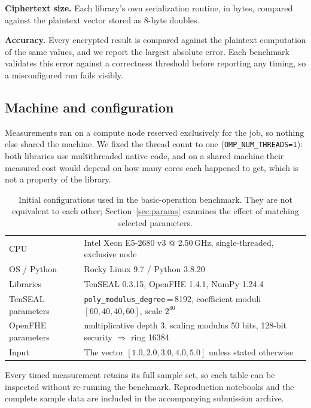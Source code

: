 \documentclass[11pt,a4paper]{article}
\begin{document}
\textbf{Ciphertext size.} Each library's own serialization routine, in bytes,
compared against the plaintext vector stored as 8-byte doubles.

\textbf{Accuracy.} Every encrypted result is compared against the plaintext
computation of the same values, and we report the largest absolute error. Each
benchmark validates this error against a correctness threshold before reporting any
timing, so a misconfigured run fails visibly.

\subsection{Machine and configuration}

Measurements ran on a compute node reserved exclusively for the job, so nothing else
shared the machine. We fixed the thread count to one
(\texttt{OMP\_NUM\_THREADS=1}): both libraries use multithreaded native code, and on
a shared machine their measured cost would depend on how many cores each happened to
get, which is not a property of the library.

\begin{table}[H]\centering\small
\begin{tabular}{@{}ll@{}}
\toprule
CPU & Intel Xeon E5-2680 v3 @ 2.50\,GHz, single-threaded, exclusive node \\
OS / Python & Rocky Linux 9.7 / Python 3.8.20 \\
Libraries & TenSEAL 0.3.15, OpenFHE 1.4.1, NumPy 1.24.4 \\
TenSEAL parameters & \texttt{poly\_modulus\_degree}\,=\,8192, coefficient moduli
  $[60,40,40,60]$, scale $2^{40}$ \\
OpenFHE parameters & multiplicative depth 3, scaling modulus 50 bits, 128-bit
  security $\Rightarrow$ ring 16384 \\
Input & The vector $[1.0, 2.0, 3.0, 4.0, 5.0]$ unless stated otherwise \\
\bottomrule
\end{tabular}
\caption{Initial configurations used in the basic-operation benchmark. They are not
equivalent to each other; Section~\ref{sec:params} examines the effect of matching
selected parameters.}
\end{table}

Every timed measurement retains its full sample set, so each table can be inspected
without re-running the benchmark. Reproduction notebooks and the complete sample
data are included in the accompanying submission archive.
\end{document}
